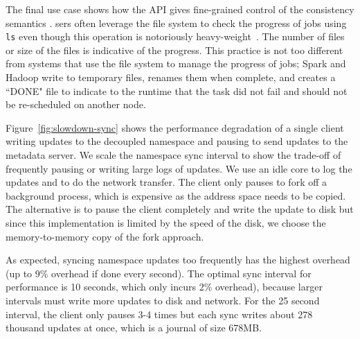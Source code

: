 The final use case shows how the API gives
 fine-grained control of the
consistency semantics . sers often
leverage the file system to check the progress of jobs using \texttt{ls} even
though this operation is notoriously heavy-weight~\cite{carns:ipdps09-pvfs,
eshel:fast10-panache}. The number of files or size of the files is indicative
of the progress. This practice is not too different from systems that use the
file system to manage the progress of jobs; Spark and Hadoop write to temporary
files, renames them when complete, and creates a ``DONE" file to indicate to
the runtime that the task did not fail and should not be re-scheduled on
another node.  


Figure~\ref{fig:slowdown-sync} shows the performance degradation of a single
client writing  updates to the decoupled namespace and
pausing to send updates to the metadata server.  We scale the namespace sync interval to
show the trade-off of frequently pausing or writing large logs of updates.  We
use an idle core to log the updates and to do the network transfer. The client
only pauses to fork off a background process, which is expensive as the address
space needs to be copied. The alternative is to pause the client completely and
write the update to disk but since this implementation is limited by the speed
of the disk, we choose the memory-to-memory copy of the fork approach.

As expected, syncing namespace updates too frequently has the highest overhead
(up to 9\% overhead if done every second). The optimal sync interval for
performance is 10 seconds, which only incurs 2\% overhead), because larger
intervals must write more updates to disk and network. For the 25 second
interval, the client only pauses 3-4 times but each sync writes about 278
thousand updates at once, which is a journal of size 678MB.

